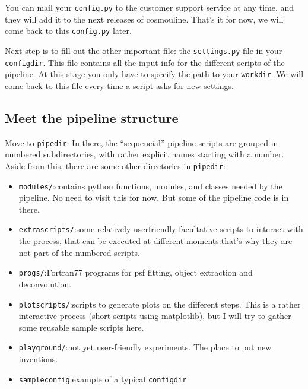
You can mail your \verb+config.py+ to the customer support service at any time, and they will add it to the next releases of cosmouline. That's it for now, we will come back to this \verb+config.py+ later.

Next step is to fill out the other important file: the \verb+settings.py+ file in your \verb+configdir+. This file contains all the input info for the different scripts of the pipeline. At this stage you only have to specify the path to your \verb+workdir+. We will come back to this file every time a script asks for new settings.


\subsection{Meet the pipeline structure}

Move to \verb+pipedir+. In there, the ``sequencial'' pipeline scripts are grouped in numbered subdirectories, with rather explicit names starting with a number. Aside from this, there are some other directories in \verb+pipedir+:

\begin{itemize}
\item \verb+modules/+:contains python functions, modules, and classes needed by the pipeline. No need to visit this for now. But some of the pipeline code is in there.

\item \verb+extrascripts/+:some relatively userfriendly facultative scripts to interact with the process, that can be executed at different moments:that's why they are not part of the numbered scripts.


\item \verb+progs/+:Fortran77 programs for psf fitting, object extraction and deconvolution.

\item \verb+plotscripts/+:scripts to generate plots on the different steps. This is a rather interactive process (short scripts using matplotlib), but I will try to gather some reusable sample scripts here.

\item \verb+playground/+:not yet user-friendly experiments. The place to put new inventions.

\item \verb+sampleconfig+:example of a typical \verb+configdir+

\end{itemize}

